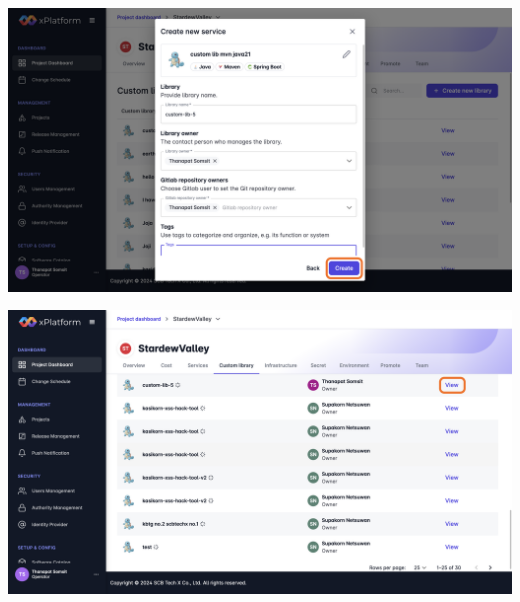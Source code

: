 \begin{center}
    \includegraphics[width=\linewidth]{resources/pages/custom-library/create-library/3.png}

    \vspace{1in}

    \includegraphics[width=\linewidth]{resources/pages/custom-library/create-library/4.png}
\end{center}

